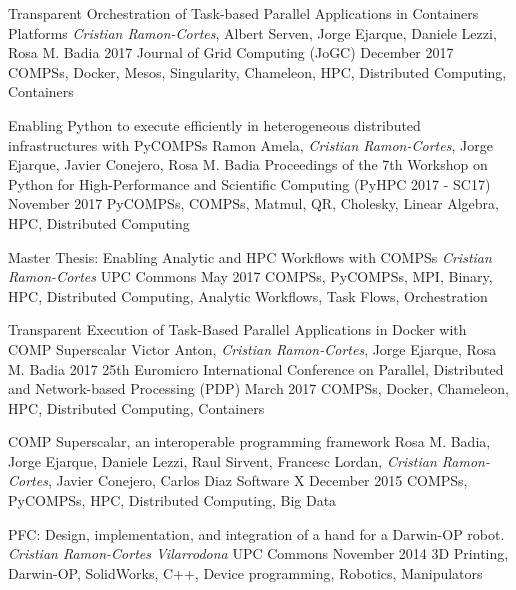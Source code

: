 \begin{publications}
    \publication
        {Transparent Orchestration of Task-based Parallel Applications in Containers Platforms}
        {\textit{Cristian Ramon-Cortes}, Albert Serven, Jorge Ejarque, Daniele Lezzi, Rosa M. Badia}
        {2017 Journal of Grid Computing (JoGC)}
        {December 2017}
        {COMPSs, Docker, Mesos, Singularity, Chameleon, HPC, Distributed Computing, Containers}
        {}

    \publication
        {Enabling Python to execute efficiently in heterogeneous distributed infrastructures with PyCOMPSs}
        {Ramon Amela, \textit{Cristian Ramon-Cortes}, Jorge Ejarque, Javier Conejero, Rosa M. Badia}
        {Proceedings of the 7th Workshop on Python for High-Performance and Scientific Computing (PyHPC 2017 - SC17)}
        {November 2017}
        {PyCOMPSs, COMPSs, Matmul, QR, Cholesky, Linear Algebra, HPC, Distributed Computing}
        {}
        
    \publication
        {Master Thesis: Enabling Analytic and HPC Workflows with COMPSs}
        {\textit{Cristian Ramon-Cortes}}
        {UPC Commons}
        {May 2017}
        {COMPSs, PyCOMPSs, MPI, Binary, HPC, Distributed Computing, Analytic Workflows, Task Flows, Orchestration}
        {}

    \publication
        {Transparent Execution of Task-Based Parallel Applications in Docker with COMP Superscalar}
        {Victor Anton, \textit{Cristian Ramon-Cortes}, Jorge Ejarque, Rosa M. Badia}
        {2017 25th Euromicro International Conference on Parallel, Distributed and Network-based Processing (PDP)}
        {March 2017}
        {COMPSs, Docker, Chameleon, HPC, Distributed Computing, Containers}
        {}

    \publication
        {COMP Superscalar, an interoperable programming framework}
        {Rosa M. Badia, Jorge Ejarque, Daniele Lezzi, Raul Sirvent, Francesc Lordan, \textit{Cristian Ramon-Cortes}, Javier Conejero, Carlos Diaz}
        {Software X}
        {December 2015}
        {COMPSs, PyCOMPSs, HPC, Distributed Computing, Big Data}
        {}
        
    \publication
        {PFC: Design, implementation, and integration of a hand for a Darwin-OP robot.}
        {\textit{Cristian Ramon-Cortes Vilarrodona}}
        {UPC Commons}
        {November 2014}
        {3D Printing, Darwin-OP, SolidWorks, C++, Device programming, Robotics, Manipulators}
        {}
    
\end{publications}
